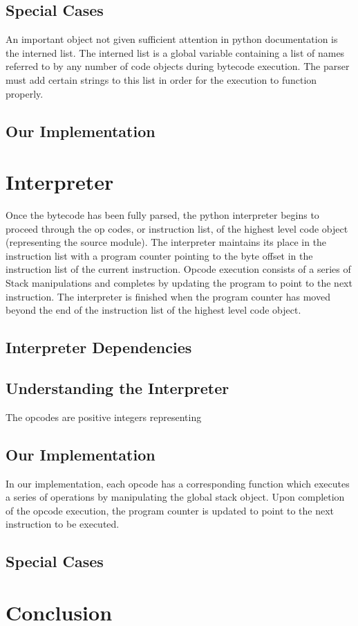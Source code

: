 \documentclass{article}
\begin{document}
\subsection{Special Cases}

An important object not given sufficient attention in python documentation is the interned list.  The interned list is a global variable containing a list of names referred to by any number of code objects during bytecode execution.  The parser must add certain strings to this list in order for the execution to function properly.

\subsection{Our Implementation}

\section{Interpreter}

Once the bytecode has been fully parsed, the python interpreter begins to proceed through the op codes, or instruction list, of the highest level code object (representing the source module).  The interpreter maintains its place in the instruction list with a program counter pointing to the byte offset in the instruction list of the current instruction.  Opcode execution consists of a series of Stack manipulations and completes by updating the program to point to the next instruction.  The interpreter is finished when the program counter has moved beyond the end of the instruction list of the highest level code object.

\subsection{Interpreter Dependencies}

\subsection{Understanding the Interpreter}

The opcodes are positive integers representing 

\subsection{Our Implementation}
In our implementation, each opcode has a corresponding function which executes a series of operations by manipulating the global stack object.  Upon completion of the opcode execution, the program counter is updated to point to the next instruction to be executed.

\subsection{Special Cases}

\section{Conclusion}
\end{document}
